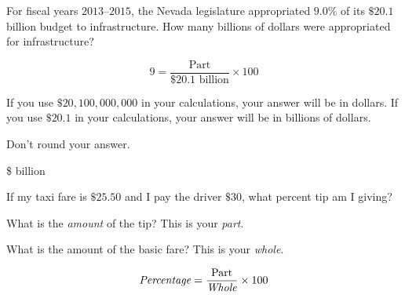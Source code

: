\documentclass{ximera}
\begin{document}
\begin{question}
For fiscal years $2013$--$2015$, the Nevada legislature appropriated $9.0\%$ of its $\$20.1$ billion budget to infrastructure. How many billions of dollars were appropriated for infrastructure? 	

\begin{hint}
\[9=\frac{\text{Part}}{\$20.1\text{ billion}}\times 100\]
\end{hint}
\begin{hint}
If you use $\$20,100,000,000$ in your calculations, your answer will be in dollars. If you use $\$20.1$ in your calculations, your answer will be in billions of dollars.
\end{hint}
\begin{hint}
Don't round your answer.
\end{hint}
\$ billion

\end{question}

\begin{question}
If my taxi fare is $\$25.50$ and I pay the driver $\$30$, what percent tip am I giving?

    \begin{multipleChoice}
    \end{multipleChoice}
    \begin{hint}
    What is the \emph{amount} of the tip? This is your \emph{part}.
    \end{hint}
    \begin{hint}
   What is the amount of the basic fare? This is your \emph{whole}.
    \end{hint}
  	\begin{hint}
    \[\emph{\text{Percentage}}=\frac{\text{Part}}{\emph{\text{Whole}}}\times 100\]
    \end{hint}

\end{question}
\end{document}
